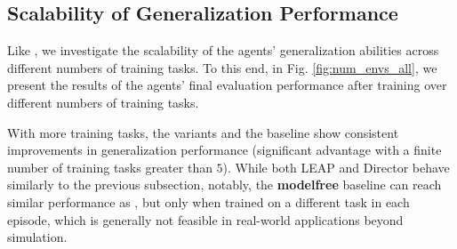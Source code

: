 \subsection{Scalability of Generalization Performance}
Like \citet{cobbe2020leveraging}, we investigate the scalability of the agents' generalization abilities across different numbers of training tasks. To this end, in Fig. \ref{fig:num_envs_all}, we present the results of the agents' final evaluation performance after training over different numbers of training tasks.

With more training tasks, the \agentshort{} variants and the baseline show consistent improvements in generalization performance (significant advantage with a finite number of training tasks greater than $5$). While both LEAP and Director behave similarly to the previous subsection, notably, the \textbf{modelfree} baseline can reach similar performance as \agentshort{}, but only when trained on a different task in each episode, which is generally not feasible in real-world applications beyond simulation.

\begin{figure*}[htbp]
\centering
\vspace*{-5mm}
\hfill
{}
\hfill
{}
\hfill
{}
\hfill
{}

\caption{\small \textbf{Generalization Performance of Agents on Different Numbers of Training Tasks}: each data point and corresponding error bar (95\% confidence interval) are based on the final performance from $20$ independent seed runs.
Training task performance is shown in (a) while OOD performance is shown in (b), (c), (d), (e). Notably, the \agentshort{} agents as well as the adapted LEAP behave poorly during training when being trained on only one task, as the split of context and partial information cannot be achieved. Training on one task invalidates the purpose of the proposed generalization-focused checkpoint generator.}
\label{fig:num_envs_all}
\end{figure*}

